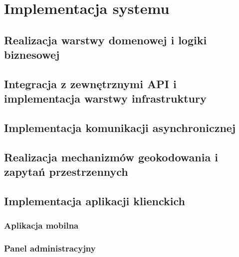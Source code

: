 \chapter{Implementacja systemu}

\section{Realizacja warstwy domenowej i logiki biznesowej}
\sectionanchor

\section{Integracja z zewnętrznymi API i implementacja warstwy infrastruktury}
\sectionanchor

\section{Implementacja komunikacji asynchronicznej}
\sectionanchor

\section{Realizacja mechanizmów geokodowania i zapytań przestrzennych}
\sectionanchor

\section{Implementacja aplikacji klienckich}
\sectionanchor

\subsection{Aplikacja mobilna}
\sectionanchor

\subsection{Panel administracyjny}
\sectionanchor

